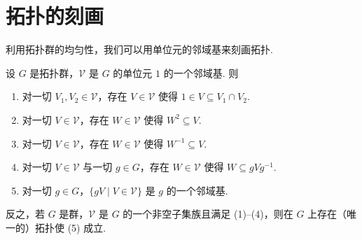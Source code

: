 \section{拓扑的刻画}

利用拓扑群的均匀性，我们可以用单位元的邻域基来刻画拓扑.

\begin{proposition}\label{c1-prop-3-1}
设 $G$ 是拓扑群，$\mathcal{V}$ 是 $G$ 的单位元 $1$ 的一个邻域基. 则
\begin{enumerate}[label=(\arabic*),leftmargin=*]
    \item 对一切 $V_{1},V_{2}\in\mathcal{V}$，存在 $V\in\mathcal{V}$ 使得 $1\in V\subseteq V_{1}\cap V_{2}$.
    \item 对一切 $V\in\mathcal{V}$，存在 $W\in\mathcal{V}$ 使得 $W^{2}\subseteq V$.
    \item 对一切 $V\in\mathcal{V}$，存在 $W\in\mathcal{V}$ 使得 $W^{-1}\subseteq V$.
    \item 对一切 $V\in\mathcal{V}$ 与一切 $g\in G$，存在 $W\in\mathcal{V}$ 使得 $W\subseteq gVg^{-1}$.
    \item 对一切 $g\in G$，$\{gV\mid V\in\mathcal{V}\}$ 是 $g$ 的一个邻域基.
\end{enumerate}
反之，若 $G$ 是群，$\mathcal{V}$ 是 $G$ 的一个非空子集族且满足 (1)--(4)，则在 $G$ 上存在（唯一的）拓扑使 (5) 成立.
\end{proposition}

